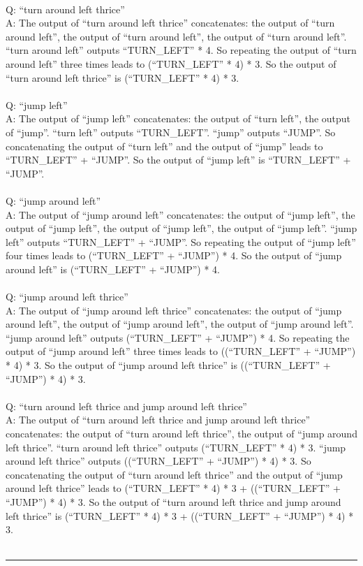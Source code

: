 {\\
Q: ``turn around left thrice'' \\
A: The output of ``turn around left thrice'' concatenates: the output of ``turn around left'', the output of ``turn around left'', the output of ``turn around left''. ``turn around left'' outputs ``TURN\_LEFT'' * 4. So repeating the output of ``turn around left'' three times leads to (``TURN\_LEFT'' * 4) * 3. So the output of ``turn around left thrice'' is (``TURN\_LEFT'' * 4) * 3. \\
\\
Q: ``jump left'' \\
A: The output of ``jump left'' concatenates: the output of ``turn left'', the output of ``jump''. ``turn left'' outputs ``TURN\_LEFT''. ``jump'' outputs ``JUMP''. So concatenating the output of ``turn left'' and the output of ``jump'' leads to ``TURN\_LEFT'' + ``JUMP''. So the output of ``jump left'' is ``TURN\_LEFT'' + ``JUMP''. \\
\\
Q: ``jump around left'' \\
A: The output of ``jump around left'' concatenates: the output of ``jump left'', the output of ``jump left'', the output of ``jump left'', the output of ``jump left''. ``jump left'' outputs ``TURN\_LEFT'' + ``JUMP''. So repeating the output of ``jump left'' four times leads to (``TURN\_LEFT'' + ``JUMP'') * 4. So the output of ``jump around left'' is (``TURN\_LEFT'' + ``JUMP'') * 4. \\
\\
Q: ``jump around left thrice'' \\
A: The output of ``jump around left thrice'' concatenates: the output of ``jump around left'', the output of ``jump around left'', the output of ``jump around left''. ``jump around left'' outputs (``TURN\_LEFT'' + ``JUMP'') * 4. So repeating the output of ``jump around left'' three times leads to ((``TURN\_LEFT'' + ``JUMP'') * 4) * 3. So the output of ``jump around left thrice'' is ((``TURN\_LEFT'' + ``JUMP'') * 4) * 3. \\
\\
Q: ``turn around left thrice and jump around left thrice'' \\
A: The output of ``turn around left thrice and jump around left thrice'' concatenates: the output of ``turn around left thrice'', the output of ``jump around left thrice''. ``turn around left thrice'' outputs (``TURN\_LEFT'' * 4) * 3. ``jump around left thrice'' outputs ((``TURN\_LEFT'' + ``JUMP'') * 4) * 3. So concatenating the output of ``turn around left thrice'' and the output of ``jump around left thrice'' leads to (``TURN\_LEFT'' * 4) * 3 + ((``TURN\_LEFT'' + ``JUMP'') * 4) * 3. So the output of ``turn around left thrice and jump around left thrice'' is (``TURN\_LEFT'' * 4) * 3 + ((``TURN\_LEFT'' + ``JUMP'') * 4) * 3. \\
\\
\hrule \bigskip
}

